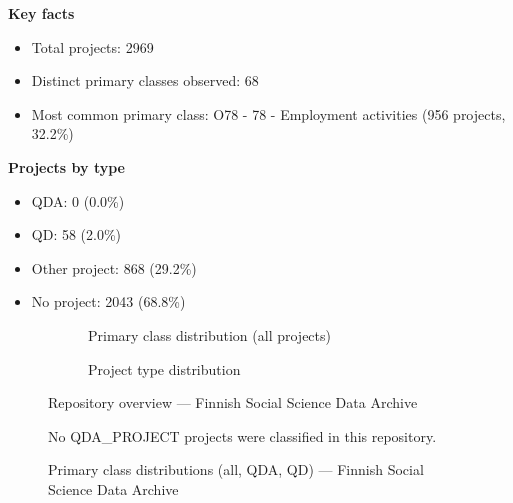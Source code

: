 \textbf{Key facts}

\begin{itemize}
    \item Total projects: 2969
    \item Distinct primary classes observed: 68
    \item Most common primary class: O78 - 78 - Employment activities (956 projects, 32.2\%)
\end{itemize}

\textbf{Projects by type}

\begin{itemize}
    \item QDA: 0 (0.0\%)
    \item QD: 58 (2.0\%)
    \item Other project: 868 (29.2\%)
    \item No project: 2043 (68.8\%)
\end{itemize}

\begin{figure}[H]
    \centering
    \begin{subfigure}[t]{0.49\textwidth}
        \centering
        
        \caption{Primary class distribution (all projects)}
    \end{subfigure}
    \hfill
    \begin{subfigure}[t]{0.49\textwidth}
        \centering
        
        \caption{Project type distribution}
    \end{subfigure}
    \caption{Repository overview --- Finnish Social Science Data Archive}
\end{figure}

\clearpage

\begin{figure}[H]
    \centering
    
    \par\vspace{0.8em}
    No QDA\_PROJECT projects were classified in this repository.
    \par\vspace{0.8em}
    
    \caption{Primary class distributions (all, QDA, QD) --- Finnish Social Science Data Archive}
\end{figure}

